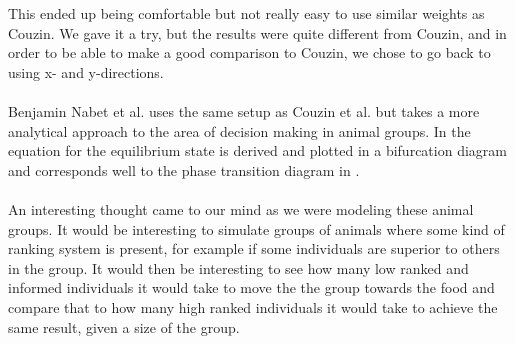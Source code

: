 This ended up being comfortable but not really easy to use similar weights as Couzin. 
We gave it a try, but the results were quite different from Couzin, and in order to be able to make a good comparison to Couzin, we chose to go back to using x- and y-directions.
\\\\
Benjamin Nabet et al. uses the same setup as Couzin et al. but takes a more analytical approach to the area of decision making in animal groups. 
In \cite{anArticle} the equation for the equilibrium state is derived and plotted in a bifurcation diagram and corresponds well to the phase transition diagram in \cite{theArticle}.
\\\\
An interesting thought came to our mind as we were modeling these animal groups. 
It would be interesting to simulate groups of animals where some kind of ranking system is present, for example if some individuals are superior to others in the group.
It would then be interesting to see how many low ranked and informed individuals it would take to move the the group towards the food and compare that to how many high ranked individuals it would take to achieve the same result, given a size of the group.